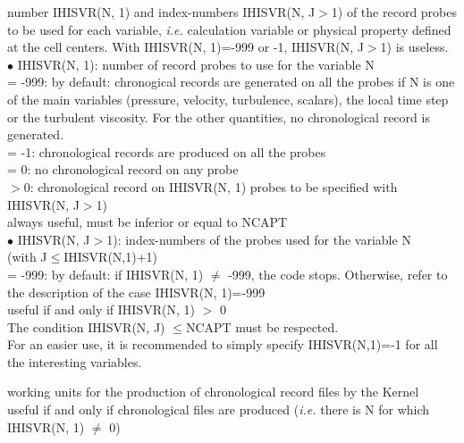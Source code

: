 {number IHISVR(N, 1) and index-numbers IHISVR(N, J$>$1) of the record
probes to be used for each variable, {\em i.e.} calculation variable
or physical property defined at the cell centers.
With IHISVR(N, 1)=-999 or -1, IHISVR(N, J$>$1) is useless.\\
\hspace*{.5cm} $\bullet$ IHISVR(N, 1): number of record probes to use
for the variable N\\ 
\hspace*{1.3cm}= -999: by default: chronogical records are generated on
all the probes if N is one of the main variables (pressure, velocity,
turbulence, scalars), the local time step or the turbulent
viscosity. For the other quantities, no chronological record is generated.\\
\hspace*{1.3cm}= -1: chronological records are produced on all the probes\\
\hspace*{1.3cm}= 0: no chronological record on any probe\\
\hspace*{1.3cm}$>0$: chronological record on IHISVR(N, 1) probes to be specified
with  IHISVR(N, J$>$1)\\
always useful, must be inferior or equal to NCAPT\\
\hspace*{.5cm} $\bullet$ IHISVR(N, J$>$1): index-numbers of the probes
used for the variable N\\ 
(with J$\leqslant$IHISVR(N,1)+1)\\
\hspace*{1.3cm}= -999: by default: if IHISVR(N, 1) $\ne$
-999, the  code stops. Otherwise, refer to the description of the case
IHISVR(N, 1)=-999\\ 
useful if and only if IHISVR(N, 1) $>$ 0 \\
The condition IHISVR(N, J) $\leqslant$NCAPT must be respected.\\
For an easier use, it is recommended to simply specify IHISVR(N,1)=-1 for
all the interesting variables.}

{working units for the production of chronological record files by the Kernel\\
useful if and only if chronological files are produced ({\em i.e.} there
is N for which IHISVR(N, 1) $\ne$ 0)}

